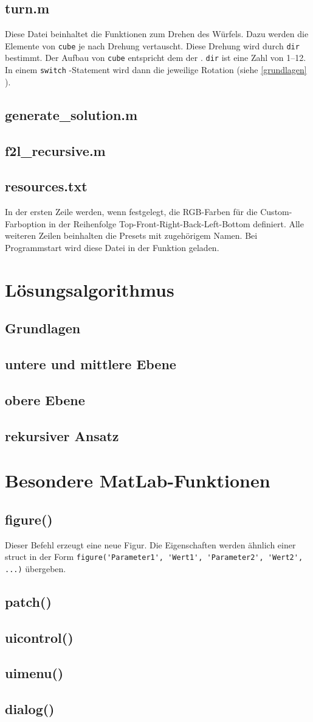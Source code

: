 \documentclass[a4paper,11pt]{scrreprt}
\newcommand{\coderef}[1]{
  \texttt{\nameref{#1}}
}
\newcommand{\codeinline}[1]{
  \lstinline!#1!
}
\newcommand{\chap}[2]{
  \chapter{#1}\label{#2}
}
\renewcommand{\sec}[2]{
  \section{#1}\label{#2}
}
\begin{document}
    \sec{turn.m}{turn}
      Diese Datei beinhaltet die Funktionen zum Drehen des Würfels. Dazu werden die Elemente von \codeinline{cube} je nach Drehung vertauscht. Diese Drehung wird durch \codeinline{dir} bestimmt. Der Aufbau von \codeinline{cube} entspricht dem der \coderef{facecolors}. \codeinline{dir} ist eine Zahl von 1--12. In einem \codeinline{switch}-Statement wird dann die jeweilige Rotation (siehe \autoref{grundlagen} ).

    \sec{generate\_solution.m}{generatesolution}

    \sec{f2l\_recursive.m}{f2lrecursive}

    \sec{resources.txt}{resources}
      In der ersten Zeile werden, wenn festgelegt, die RGB-Farben für die Custom-Farboption in der Reihenfolge Top-Front-Right-Back-Left-Bottom definiert. Alle weiteren Zeilen beinhalten die Presets mit zugehörigem Namen. Bei Programmstart wird diese Datei in der Funktion \coderef{loadpresets} geladen.

  \chap{Lösungsalgorithmus}{algorithm}
    \sec{Grundlagen}{grundlagen}

    \sec{untere und mittlere Ebene}{f2l}

    \sec{obere Ebene}{oben}

    \sec{rekursiver Ansatz}{recursive}

  \chap{Besondere MatLab-Funktionen}{matlab}
    \sec{figure()}{figure}
      Dieser Befehl erzeugt eine neue Figur. Die Eigenschaften werden ähnlich einer struct in der Form \codeinline{figure('Parameter1', 'Wert1', 'Parameter2', 'Wert2', ...)} übergeben.

    \sec{patch()}{patch}

    \sec{uicontrol()}{uicontrol}

    \sec{uimenu()}{uimenu}

    \sec{dialog()}{dialog}
\end{document}
